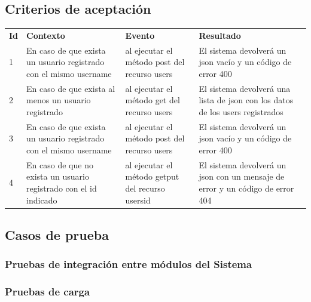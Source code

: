 \documentclass[a4paper,12pt]{article}
\begin{document}
\subsection{Criterios de aceptación}

\begin{center}
\begin{longtable}{|p{0.5cm}|p{4cm}|p{4cm}|p{5cm}|}
\hline \hline \rowcolor[gray]{0.9}
	\multicolumn{4}{||c|}{\textbf{Criterio de aceptación}} \\
    \hline  \rowcolor[gray]{0.9}
        \textbf{Id} &
        \textbf{Contexto} &
        \textbf{Evento}&
        \textbf{Resultado} \\
    \hline
1&En caso de que exista un usuario registrado con el mismo username & al ejecutar el método post del recurso \/users  & El sistema devolverá un json vacío y un código de error 400 \\ \hline
	\hline
2&En caso de que exista al menos un usuario registrado & al ejecutar el método get del recurso \/users  & El sistema devolverá una lista de json con los datos de los users registrados \\ 		\hline
	\hline
3&En caso de que exista un usuario registrado con el mismo username & al ejecutar el método post del recurso \/users  & El sistema devolverá un json vacío y un código de error 400 \\ \hline
    \hline
4&En caso de que no exista un usuario registrado con el id indicado & al ejecutar el método get\/put del recurso \/users\/id  & El sistema devolverá un json con un mensaje de error y un código de error 404 \\ \hline

  \end{longtable}
\end{center}

\subsection{Casos de prueba}

\subsubsection{Pruebas de integración entre módulos del Sistema}

\subsubsection{Pruebas de carga}
\end{document}
